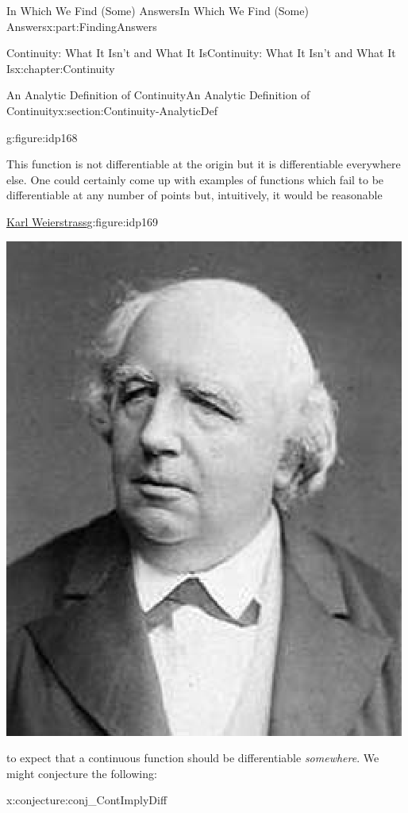 \documentclass[oneside,10pt,]{book}
\numberwithin{equation}{section}
\begin{document}
\begin{partptx}{In Which We Find (Some) Answers}{}{In Which We Find (Some) Answers}{}{}{x:part:FindingAnswers}
\begin{chapterptx}{Continuity: What It Isn't and What It Is}{}{Continuity: What It Isn't and What It Is}{}{}{x:chapter:Continuity}
\begin{sectionptx}{An Analytic Definition of Continuity}{}{An Analytic Definition of Continuity}{}{}{x:section:Continuity-AnalyticDef}
\begin{figureptx}{}{g:figure:idp168}{}
\tcblower
\end{figureptx}%
This function is not differentiable at the origin but it is differentiable everywhere else.  One could certainly come up with examples of functions which fail to be differentiable at any number of points but, intuitively, it would be reasonable%
\begin{figureptx}{\href{https://mathshistory.st-andrews.ac.uk/Biographies/Weierstrass/}{Karl Weierstrass}\protect\footnotemark{}}{g:figure:idp169}{}%
%
\begin{image}{0.325}{0.35}{0.325}%
\includegraphics[width=\linewidth]{images/Weierstrass.png}
\end{image}%
\tcblower
\end{figureptx}%
%
to expect that a continuous function should be differentiable \emph{somewhere}.  We might conjecture the following:%
\begin{conjecture}{}{}{x:conjecture:conj_ContImplyDiff}%

\end{conjecture}
\end{sectionptx}
\end{chapterptx}
\end{partptx}
\end{document}
